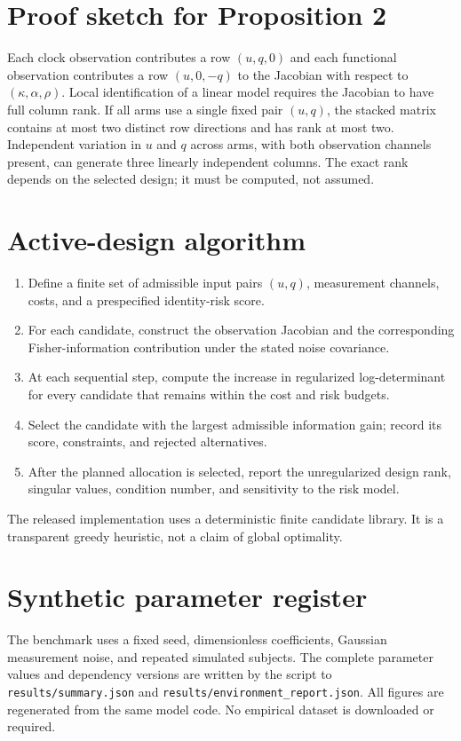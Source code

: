 \documentclass[10pt,a4paper]{article}
\begin{document}
\section{Proof sketch for Proposition 2}
Each clock observation contributes a row \((u,q,0)\) and each functional observation contributes a row \((u,0,-q)\) to the Jacobian with respect to \((\kappa,\alpha,\rho)\). Local identification of a linear model requires the Jacobian to have full column rank. If all arms use a single fixed pair \((u,q)\), the stacked matrix contains at most two distinct row directions and has rank at most two. Independent variation in \(u\) and \(q\) across arms, with both observation channels present, can generate three linearly independent columns. The exact rank depends on the selected design; it must be computed, not assumed.

\section{Active-design algorithm}
\begin{enumerate}
\item Define a finite set of admissible input pairs \((u,q)\), measurement channels, costs, and a prespecified identity-risk score.
\item For each candidate, construct the observation Jacobian and the corresponding Fisher-information contribution under the stated noise covariance.
\item At each sequential step, compute the increase in regularized log-determinant for every candidate that remains within the cost and risk budgets.
\item Select the candidate with the largest admissible information gain; record its score, constraints, and rejected alternatives.
\item After the planned allocation is selected, report the unregularized design rank, singular values, condition number, and sensitivity to the risk model.
\end{enumerate}
The released implementation uses a deterministic finite candidate library. It is a transparent greedy heuristic, not a claim of global optimality.

\section{Synthetic parameter register}
The benchmark uses a fixed seed, dimensionless coefficients, Gaussian measurement noise, and repeated simulated subjects. The complete parameter values and dependency versions are written by the script to \texttt{results/summary.json} and \texttt{results/environment\_report.json}. All figures are regenerated from the same model code. No empirical dataset is downloaded or required.
\end{document}

